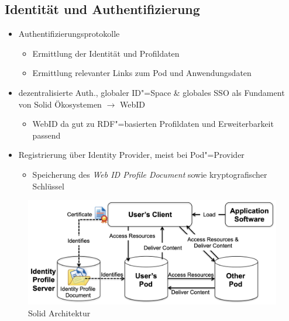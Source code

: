 \begin{itemize}
\end{itemize}



\subsection{Identität und Authentifizierung}

\begin{itemize}
    \item Authentifizierungsprotokolle
    \begin{itemize}
        \item Ermittlung der Identität und Profildaten
        \item Ermittlung relevanter Links zum Pod und Anwendungsdaten~\cite{sambraSolidPlatformDecentralized2016}
    \end{itemize}
    \item dezentralisierte Auth., globaler ID"=Space \& globales SSO als Fundament von Solid Ökosystemen $\to$ WebID~\cite{sambraSolidPlatformDecentralized2016}
    \begin{itemize}
        \item WebID da gut zu RDF"=basierten Profildaten und Erweiterbarkeit passend~\cite{sambraSolidPlatformDecentralized2016}
    \end{itemize}

    \item Registrierung über Identity Provider, meist bei Pod"=Provider~\cite{sambraSolidPlatformDecentralized2016}
    \begin{itemize}
        \item Speicherung des \emph{Web ID Profile Document} sowie kryptografischer Schlüssel
    \end{itemize}
\end{itemize}

\begin{figure}
    \includegraphics[width=\textwidth]{../shared/assets/sambra_solid_architecture.png}
    \caption{Solid Architektur~\cite{sambraSolidPlatformDecentralized2016}}
\end{figure}

